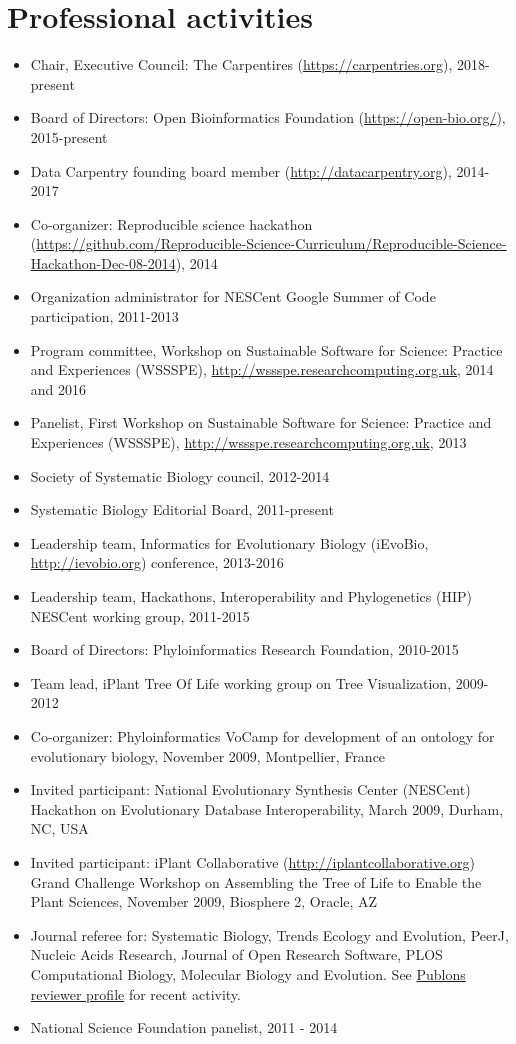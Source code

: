 \documentclass[10pt]{article}
\begin{document}
\section*{Professional activities}
\begin{itemize}
\item{Chair, Executive Council: The Carpentires (\url{https://carpentries.org}), 2018-present}
\item{Board of Directors: Open Bioinformatics Foundation (\url{https://open-bio.org/}), 2015-present}
\item{Data Carpentry founding board member (\url{http://datacarpentry.org}), 2014-2017}
\item{Co-organizer: Reproducible science hackathon (\url{https://github.com/Reproducible-Science-Curriculum/Reproducible-Science-Hackathon-Dec-08-2014}), 2014}
\item{Organization administrator for NESCent Google Summer of Code participation, 2011-2013}
\item{Program committee, Workshop on Sustainable Software for Science: Practice and Experiences (WSSSPE), \url{http://wssspe.researchcomputing.org.uk}, 2014 and 2016}
\item{Panelist, First Workshop on Sustainable Software for Science: Practice and Experiences (WSSSPE), \url{http://wssspe.researchcomputing.org.uk}, 2013}
\item{Society of Systematic Biology council, 2012-2014}
\item{Systematic Biology Editorial Board, 2011-present}
\item{Leadership team, Informatics for Evolutionary Biology (iEvoBio, \url{http://ievobio.org}) conference, 2013-2016}
\item{Leadership team, Hackathons, Interoperability and Phylogenetics (HIP) NESCent working group, 2011-2015}
\item{Board of Directors: Phyloinformatics Research Foundation, 2010-2015}
\item{Team lead, iPlant Tree Of Life working group on Tree Visualization, 2009-2012}
\item{Co-organizer: Phyloinformatics VoCamp for development of an ontology for evolutionary biology, November 2009, Montpellier, France}
\item{Invited participant: National Evolutionary Synthesis Center (NESCent) Hackathon on Evolutionary Database Interoperability, March 2009, Durham, NC, USA}
\item{Invited participant: iPlant Collaborative (\url{http://iplantcollaborative.org}) Grand Challenge Workshop on Assembling the Tree of Life to Enable the Plant Sciences, November 2009, Biosphere 2, Oracle, AZ}
\item{Journal referee for: Systematic Biology, Trends Ecology and Evolution, PeerJ, Nucleic Acids Research, Journal of Open Research Software, PLOS Computational Biology, Molecular Biology and Evolution}. See \href{https://publons.com/a/213683/}{Publons reviewer profile} for recent activity. 
\item{National Science Foundation panelist, 2011 - 2014}
\end{itemize}
\end{document}
